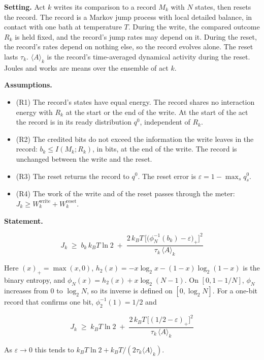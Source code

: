 \documentclass[
  10pt,
]{article}
\providecommand{\tightlist}{%
  \setlength{\itemsep}{0pt}\setlength{\parskip}{0pt}}
\begin{document}
\textbf{Setting.} Act \(k\) writes its comparison to a record \(M_k\)
with \(N\) states, then resets the record. The record is a Markov jump
process with local detailed balance, in contact with one bath at
temperature \(T\). During the write, the compared outcome \(R_k\) is
held fixed, and the record's jump rates may depend on it. During the
reset, the record's rates depend on nothing else, so the record evolves
alone. The reset lasts \(\tau_k\). \(\langle A\rangle_k\) is the
record's time-averaged dynamical activity during the reset. Joules and
works are means over the ensemble of act \(k\).

\textbf{Assumptions.}

\begin{itemize}
\tightlist
\item
  (R1) The record's states have equal energy. The record shares no
  interaction energy with \(R_k\) at the start or the end of the write.
  At the start of the act the record is in its ready distribution
  \(q^0\), independent of \(R_k\).
\item
  (R2) The credited bits do not exceed the information the write leaves
  in the record: \(b_k \le I(M_k; R_k)\), in bits, at the end of the
  write. The record is unchanged between the write and the reset.
\item
  (R3) The reset returns the record to \(q^0\). The reset error is
  \(\varepsilon = 1 - \max_s q^0_s\).
\item
  (R4) The work of the write and of the reset passes through the meter:
  \(J_k \ge W_k^{\mathrm{write}} + W_k^{\mathrm{reset}}\).
\end{itemize}

\textbf{Statement.}

\[J_k \;\ge\; b_k\, k_B T \ln 2 \;+\; \frac{2\, k_B T\, \big[\big(\phi_N^{-1}(b_k) - \varepsilon\big)_+\big]^2}{\tau_k\, \langle A\rangle_k}\]

Here \((x)_+ = \max(x, 0)\), \(h_2(x) = -x\log_2 x - (1-x)\log_2(1-x)\)
is the binary entropy, and \(\phi_N(x) = h_2(x) + x\log_2(N-1)\). On
\([0, 1 - 1/N]\), \(\phi_N\) increases from 0 to \(\log_2 N\), so its
inverse is defined on \([0, \log_2 N]\). For a one-bit record that
confirms one bit, \(\phi_2^{-1}(1) = 1/2\) and

\[J_k \;\ge\; k_B T \ln 2 \;+\; \frac{2\, k_B T\, \big[(1/2 - \varepsilon)_+\big]^2}{\tau_k\, \langle A\rangle_k}\]

As \(\varepsilon \to 0\) this tends to
\(k_B T\ln 2 + k_B T/(2\tau_k\langle A\rangle_k)\).
\end{document}
